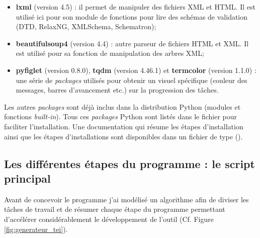 \begin{itemize}
    \item \textbf{lxml} (version 4.5) : il permet de manipuler des fichiers XML et HTML. Il est utilisé ici pour son module de fonctions pour lire des schémas de validation (DTD, RelaxNG, XMLSchema, Schematron);
    \item \textbf{beautifulsoup4} (version 4.4) : autre parseur de fichiers HTML et XML. Il est utilisé pour sa fonction de manipulation des arbres XML;
    \item \textbf{pyfiglet} (version 0.8.0), \textbf{tqdm} (version 4.46.1) et \textbf{termcolor} (version 1.1.0) : une série de \textit{packages} utilisés pour obtenir un visuel spécifique (couleur des messages, barres d'avancement etc.) sur la progression des tâches.
\end{itemize}
\bigskip
Les autres \textit{packages} sont déjà inclus dans la distribution Python (modules et fonctions \textit{built-in}). Tous ces \textit{packages} Python sont listés dans le fichier  pour faciliter l'installation. Une documentation qui résume les étapes d'installation ainsi que les étapes d'installations sont disponibles dans un fichier de type  ().\\

\subsection{Les différentes étapes du programme : le script principal }

Avant de concevoir le programme j'ai modélisé un algorithme afin de diviser les tâches de travail et de résumer chaque étape du programme permettant d'accélérer considérablement le développement de l'outil (Cf. Figure \ref{fig:generateur_tei}).\\

